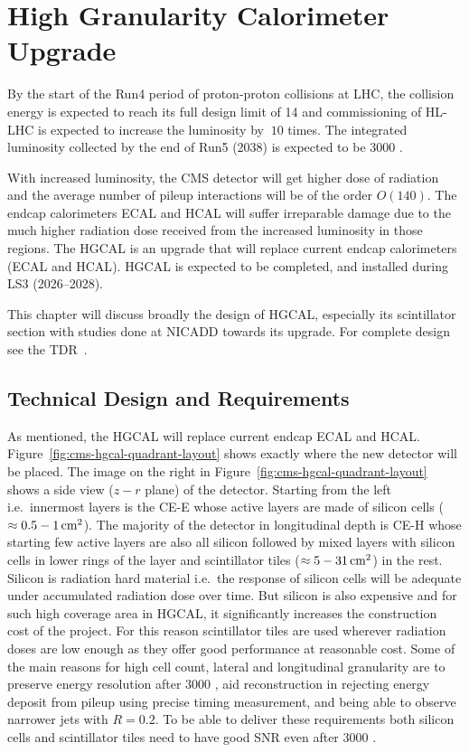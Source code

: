 \chapter{
  High Granularity Calorimeter Upgrade
 }\label{ch_hgcal}

By the start of the Run4 period of proton-proton collisions
at \gls{LHC}, the collision energy is expected to
reach its full design limit of 14 \TeV{} and
commissioning of \gls{HL-LHC} is expected to
increase the luminosity by \(~10\) times.
The integrated luminosity collected by the end of Run5 (2038)
is expected to be 3000 \fbinv{}.

With increased luminosity, the \gls{CMS} detector will get
higher dose of radiation and the average number of pileup interactions
will be of the order \( O(140) \). The endcap calorimeters \gls{ECAL} and \gls{HCAL} will suffer
irreparable damage due to the much higher radiation dose received
from the increased luminosity in those regions.
The \gls{HGCAL} is an upgrade that will replace current endcap calorimeters
(\gls{ECAL} and \gls{HCAL}).
\gls{HGCAL} is expected to be completed, and installed
during \gls{LS3} (2026--2028).

This chapter will discuss broadly the design
of \gls{HGCAL}, especially its scintillator section with
studies done at \gls{NICADD} towards its upgrade.
For complete design see the \gls{TDR}~\cite{cms-hgcal-tdr}.

\section{
  Technical Design and Requirements
 }\label{ch_hgcal:technical-design}

As mentioned, the \gls{HGCAL} will replace current endcap \gls{ECAL} and
\gls{HCAL}. Figure~\ref{fig:cms-hgcal-quadrant-layout}
shows exactly where the new detector will be placed. The image on the right in
Figure~\ref{fig:cms-hgcal-quadrant-layout} shows a side view (\( z-r \) plane)
of the detector. Starting from the left i.e.~innermost layers is the
\gls{CE-E} whose active layers are made of silicon cells
(\( \approx 0.5-1 \,\text{cm}{}^2\)). The
majority of the detector in longitudinal depth is \gls{CE-H}
whose starting few active layers are also all silicon followed
by mixed layers with silicon cells in lower rings of the
layer and scintillator tiles (\( \approx 5-31 \,\text{cm}{}^2\)) in the rest.
Silicon is radiation hard material i.e.~the response of silicon cells
will be adequate under accumulated radiation dose over time. But
silicon is also expensive and for such high coverage area in \gls{HGCAL},
it significantly increases the construction cost of the project. For this
reason scintillator tiles are used wherever radiation doses are low
enough as they offer good performance at reasonable cost.
Some of the main reasons for high cell count, lateral and longitudinal granularity
are to preserve energy resolution after 3000 \fbinv{}, aid 
reconstruction in rejecting energy deposit from pileup using precise timing measurement, and
being able to observe narrower jets with \( R = 0.2 \).
To be able to deliver these requirements both silicon cells and scintillator tiles
need to have good \gls{SNR} even after 3000 \fbinv{}.

